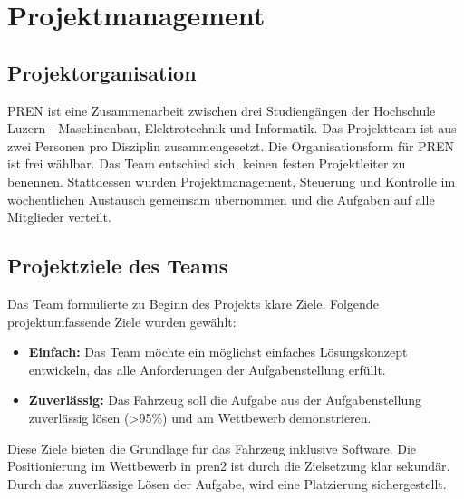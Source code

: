 \documentclass[../main.tex]{subfiles}
\begin{document}
\newpage
\section{Projektmanagement}

\subsection {Projektorganisation}
PREN ist eine Zusammenarbeit zwischen drei Studiengängen der Hochschule Luzern - Maschinenbau, Elektrotechnik und Informatik. Das Projektteam ist aus zwei Personen pro Disziplin zusammengesetzt. Die Organisationsform für PREN ist frei wählbar. Das Team entschied sich, keinen festen Projektleiter zu benennen. Stattdessen wurden Projektmanagement, Steuerung und Kontrolle im wöchentlichen Austausch gemeinsam übernommen und die Aufgaben auf alle Mitglieder verteilt.

\subsection{Projektziele des Teams}
Das Team formulierte zu Beginn des Projekts klare Ziele. Folgende projektumfassende Ziele wurden gewählt:
\begin{itemize}
\item \textbf{Einfach:} Das Team möchte ein möglichst einfaches Lösungskonzept entwickeln, das alle Anforderungen der Aufgabenstellung erfüllt.
\item \textbf{Zuverlässig:} Das Fahrzeug soll die Aufgabe aus der Aufgabenstellung zuverlässig lösen (>95\%) und am Wettbewerb demonstrieren.
\end{itemize}

Diese Ziele bieten die Grundlage für das Fahrzeug inklusive Software.
Die Positionierung im Wettbewerb in \acrshort{pren2} ist durch die Zielsetzung klar sekundär. Durch das zuverlässige Lösen der Aufgabe, wird eine Platzierung sichergestellt.
\end{document}
